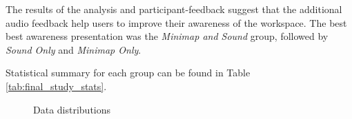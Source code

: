 

The results of the analysis and participant-feedback suggest that the additional audio feedback help users to improve their awareness of the workspace. The best best awareness presentation was the \textit{Minimap and Sound} group, followed by \textit{Sound Only} and \textit{Minimap Only}.

Statistical summary for each group can be found in Table \ref{tab:final_study_stats}.

\begin{figure}
	\centering
	
	

	
	
	\par \smallskip
	
	\caption{Data distributions}
	\label{fig:histograms}
\end{figure}

